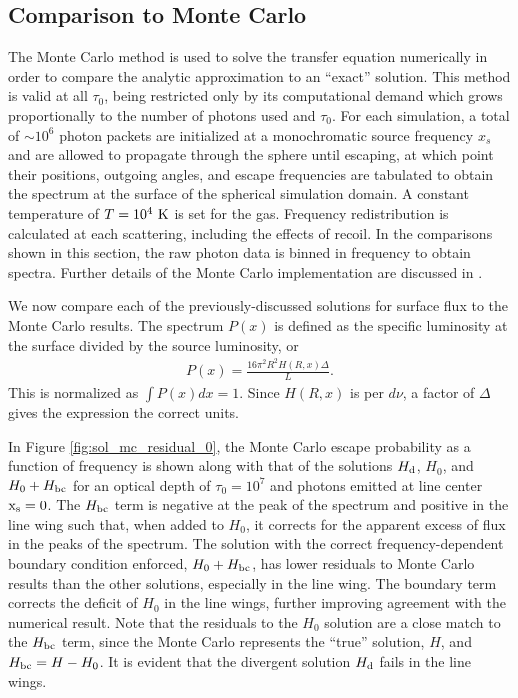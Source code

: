 \documentclass[linenumbers]{aastex63}
\newcommand{\be}{\begin{eqnarray}}
\newcommand{\ee}{\end{eqnarray}}
\begin{document}
\subsection{Comparison to Monte Carlo}
The Monte Carlo method is used to solve the transfer equation numerically in order to compare the analytic approximation to an ``exact'' solution. This method is valid at all $\tau_0$, being restricted only by its computational demand which grows proportionally to the number of photons used and $\tau_0$. For each simulation, a total of ${\sim}10^6$ photon packets are initialized at a monochromatic source frequency $x_s$ and are allowed to propagate through the sphere until escaping, at which point their positions, outgoing angles, and escape frequencies are tabulated to obtain the spectrum at the surface of the spherical simulation domain. A constant temperature of $T=10^4\ \rm K$ is set for the gas. Frequency redistribution is calculated at each scattering, including the effects of recoil. In the comparisons shown in this section, the raw photon data is binned in frequency to obtain spectra. Further details of the Monte Carlo implementation are discussed in \cite{2017ApJ...851..150H}.

We now compare each of the previously-discussed solutions for surface flux to the Monte Carlo results. The spectrum $P(x)$ is defined as the specific luminosity at the surface divided by the source luminosity, or
\be \label{eq:prob_spectrum}
P(x) = \frac{16\pi^2R^2H(R, x)\Delta}{L}.
\ee
This is normalized as $\int P(x)dx = 1$. Since $H(R, x)$ is per $d\nu$, a factor of $\Delta$ gives the expression the correct units. 

In Figure \ref{fig:sol_mc_residual_0}, the Monte Carlo escape probability as a function of frequency is shown along with that of the solutions $H_{\rm d}$, $H_0$, and $H_0 + H_{\rm bc}$ for an optical depth of $\tau_0 = 10^7$ and photons emitted at line center $\rm x_s = 0$.  The $H_{\rm bc}$ term is negative at the peak of the spectrum and positive in the line wing such that, when added to $H_0$, it corrects for the apparent excess of flux in the peaks of the spectrum. The solution with the correct frequency-dependent boundary condition enforced, $H_0 + H_{\rm bc}$, has lower residuals to Monte Carlo results than the other solutions, especially in the line wing. The boundary term corrects the deficit of $H_0$ in the line wings, further improving agreement with the numerical result. Note that the residuals to the $H_0$ solution are a close match to the $H_{\rm bc}$ term, since the Monte Carlo represents the ``true'' solution, $H$, and $H_{\rm bc} = H - H_0$. It is evident that the divergent solution $H_{\rm d}$ fails in the line wings.
\end{document}
